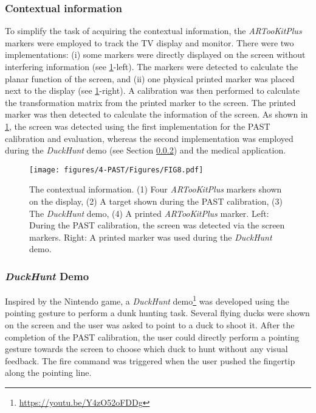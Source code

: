 \subsubsection{Contextual information} {\label{sec:4:markerDetection}}
To simplify the task of acquiring the contextual information, the \textit{ARTooKitPlus} \citep{Wagner2007a} markers were employed to track the TV display and monitor. There were two implementations: (i) some markers were directly displayed on the screen without interfering information (see \figurename{ \ref{fig:MarkerTracking}-left}). The markers were detected to calculate the planar function of the screen, and (ii) one physical printed marker was placed next to the display (see \figurename{ \ref{fig:MarkerTracking}-right}). A calibration was then performed to calculate the transformation matrix from the printed marker to the screen. The printed marker was then detected to calculate the information of the screen. 
As shown in \figurename{ \ref{fig:MarkerTracking}}, the screen was detected using the first implementation for the PAST calibration and evaluation, whereas the second implementation was employed during the \textit{DuckHunt} demo (see Section \ref{sec:4:PointingDemo}) and the medical application.
\begin{figure}
	\centering
	\texttt{[image: figures/4-PAST/Figures/FIG8.pdf]}
	\caption{The contextual information. (1) Four \textit{ARTooKitPlus} markers shown on the display, (2) A target shown during the PAST calibration, (3) The \textit{DuckHunt} demo, (4) A printed \textit{ARTooKitPlus} marker. Left: During the PAST calibration, the screen was detected via the screen markers. Right: A printed marker was used during the \textit{DuckHunt} demo.}
	\label{fig:MarkerTracking}
\end{figure}
\subsubsection{\textit{DuckHunt} Demo} \label{sec:4:PointingDemo}
Inspired by the Nintendo game, a \textit{DuckHunt} demo\footnote{\url{https://youtu.be/Y4zO52oFDDg}} was developed using the pointing gesture to perform a dunk hunting task. Several flying ducks were shown on the screen and the user was asked to point to a duck to shoot it. 
After the completion of the PAST calibration, the user could directly perform a pointing gesture towards the screen to choose which duck to hunt without any visual feedback. The fire command was triggered when the user pushed the fingertip along the pointing line.

